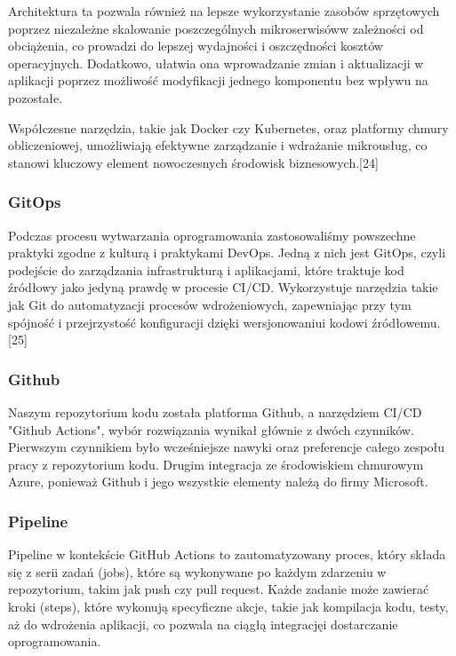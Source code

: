 Architektura ta pozwala również na lepsze wykorzystanie zasobów sprzętowych poprzez niezależne skalowanie poszczególnych mikroserwisów\linebreak w zależności od obciążenia, co prowadzi do lepszej wydajności i oszczędności kosztów operacyjnych. Dodatkowo, ułatwia ona wprowadzanie zmian \linebreak i aktualizacji w aplikacji poprzez możliwość modyfikacji jednego komponentu bez wpływu na pozostałe.

Współczesne narzędzia, takie jak Docker czy Kubernetes, oraz platformy chmury obliczeniowej, umożliwiają efektywne zarządzanie i wdrażanie mikrousług, co stanowi kluczowy element nowoczesnych środowisk biznesowych.[24]

\subsubsection{GitOps}
Podczas procesu wytwarzania oprogramowania zastosowaliśmy powszechne praktyki zgodne z kulturą i praktykami DevOps. Jedną z nich jest GitOps, czyli podejście do zarządzania infrastrukturą i aplikacjami, które traktuje kod źródłowy jako jedyną prawdę w procesie CI/CD. Wykorzystuje narzędzia takie jak Git do automatyzacji procesów wdrożeniowych, zapewniając przy tym spójność i przejrzystość konfiguracji dzięki wersjonowaniu\linebreak i kodowi źródłowemu.[25]

\subsubsection{Github}
Naszym repozytorium kodu została platforma Github, a narzędziem CI/CD "Github Actions", wybór rozwiązania wynikał głównie z dwóch czynników. Pierwszym czynnikiem było wcześniejsze nawyki oraz preferencje całego zespołu pracy z repozytorium kodu. Drugim integracja ze środowiskiem chmurowym Azure, ponieważ Github i jego wszystkie elementy należą do firmy Microsoft.

\subsubsection{Pipeline}
Pipeline w kontekście GitHub Actions to zautomatyzowany proces, który składa się z serii zadań (jobs), które są wykonywane po każdym zdarzeniu w repozytorium, takim jak push czy pull request. Każde zadanie może zawierać kroki (steps), które wykonują specyficzne akcje, takie jak kompilacja kodu, testy, aż do wdrożenia aplikacji, co pozwala na ciągłą integrację\linebreak i dostarczanie oprogramowania.

